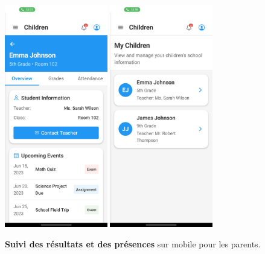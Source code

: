 \begin{figure}[H]
  \centering
  \includegraphics[width=0.4\textwidth,keepaspectratio]{pfe-pics/Mobile /Parent /Screenshot_20250610_133032_Expo Go.jpg}
  \includegraphics[width=0.4\textwidth,keepaspectratio]{pfe-pics/Mobile /Parent /Screenshot_20250610_133047_Expo Go.jpg}
  \caption{\textbf{Suivi des résultats et des présences} sur mobile pour les parents.}
  \label{fig:mobile_parent_monitoring}
\end{figure}

